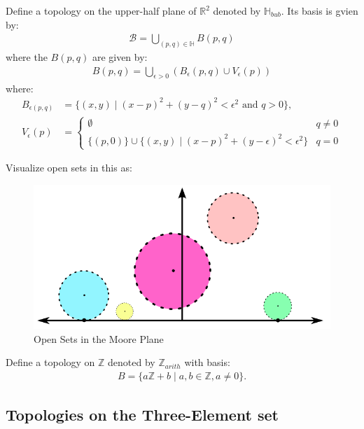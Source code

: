 \documentclass[12pt,letterpaper,reqno]{article}
\begin{document}
\begin{topology}\label{topology:r-bub-topology}
    Define a topology on the upper-half plane of $\mathbb{R}^2$ denoted by $\mathbb{H}_{bub}$. Its basis is gvien by:
    \begin{align*}
        \mathcal{B} = \bigcup_{(p, q) \in \mathbb{H}} B(p, q)
    \end{align*}
    where the $B(p, q)$ are given by:
    \begin{align*}
        B(p, q) = \bigcup_{\epsilon > 0} \left( B_{\epsilon}(p, q) \cup V_{\epsilon}(p) \right)
    \end{align*}
    where:
    \begin{align*}
        B_{\epsilon(p, q)} &= \{ (x, y) \mid (x-p)^2 + (y-q)^2 < \epsilon^2 \text{ and } q > 0 \}, \\
        V_{\epsilon}(p) &= \begin{cases}
            \emptyset & q \neq 0 \\
            \{(p, 0) \} \cup \{ (x, y) \mid (x-p)^2 + (y-\epsilon)^2 < \epsilon^2 \} & q = 0
        \end{cases}
    \end{align*}
\end{topology}

Visualize open sets in this as:
\begin{figure}[htp!]
    \centering
    \includegraphics[width=0.5\linewidth]{pics/openSetsinMoorePlane.png}
    \caption{Open Sets in the Moore Plane}
\end{figure}

\begin{topology}\label{topology:z-arith-topology}
    Define a topology on $\mathbb{Z}$ denoted by $\mathbb{Z}_{arith}$ with basis:
    \begin{align*}
        B = \{ a \mathbb{Z} + b \mid a, b \in \mathbb{Z}, a \neq 0 \}.
    \end{align*}
\end{topology}

\subsection{Topologies on the Three-Element set}
\end{document}
